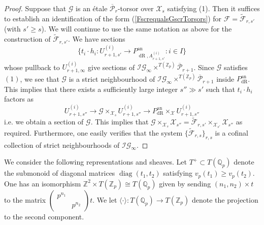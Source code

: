 \documentclass[10pt, oneside]{amsart}
\renewcommand{\tilde}{\widetilde}
\numberwithin{equation}{subsection}
\theoremstyle{definition}
\theoremstyle{remark}
\newcommand{\mbb}[1]{\mathbb{#1}}
\newcommand{\opn}[1]{\operatorname{#1}}
\begin{document}
\begin{proof}
    Suppose that $\mathscr{G}$ is an \'{e}tale $\overline{\mathcal{P}}_{r}$-torsor over $\mathcal{X}_s$ satisfying (1). Then it suffices to establish an identification of the form (\ref{FscrequalsGscrTorsors}) for $\mathscr{F} = \tilde{\mathcal{F}}_{r, s'}$ (with $s' \geq s$). We will continue to use the same notation as above for the construction of $\tilde{\mathcal{F}}_{r, s'}$. We have sections 
    \[
    \{ t_i \cdot h_i \colon U_{r+1, s'}^{(i)} \to P_{\opn{dR}, A_{r+1, s'}^{(i)}}^{\opn{an}} : i \in I \}
    \]
    whose pullback to $U_{r+1, \infty}^{(i)}$ give sections of $\mathcal{IG}_{\infty} \times^{T(\mbb{Z}_p)} \overline{\mathcal{P}}_{r+1}$. Since $\mathscr{G}$ satisfies $(1)$, we see that $\mathscr{G}$ is a strict neighbourhood of $\mathcal{IG}_{\infty} \times^{T(\mbb{Z}_p)} \overline{\mathcal{P}}_{r+1}$ inside $P_{\opn{dR}}^{\opn{an}}$. This implies that there exists a sufficiently large integer $s'' \gg s'$ such that $t_i \cdot h_i$ factors as
    \[
    U_{r+1, s''}^{(i)} \to \mathscr{G} \times_{\mathcal{X}_s} U_{r+1, s''}^{(i)} \to P_{\opn{dR}}^{\opn{an}} \times_{\mathcal{X}} U_{r+1, s''}^{(i)}
    \]
    i.e. we obtain a section of $\mathscr{G}$. This implies that $\mathscr{G} \times_{\mathcal{X}_s} \mathcal{X}_{s''} = \tilde{\mathcal{F}}_{r, s'} \times_{\mathcal{X}_{s'}} \mathcal{X}_{s''}$ as required. Furthermore, one easily verifies that the system $\{\tilde{\mathcal{F}}_{r, s} \}_{r, s}$ is a cofinal collection of strict neighbourhoods of $\mathcal{IG}_{\infty}$.
\end{proof}

We consider the following representations and sheaves. Let $T^+ \subset T(\mbb{Q}_p)$ denote the submonoid of diagonal matrices $\opn{diag}(t_1, t_2)$ satisfying $v_p(t_1) \geq v_p(t_2)$. One has an isomorphism $\mbb{Z}^2 \times T(\mbb{Z}_p) \cong T(\mbb{Q}_p)$ given by sending $(n_1, n_2) \times t$ to the matrix $\left( \begin{smallmatrix} p^{n_1} & \\ & p^{n_2} \end{smallmatrix}\right) t$. We let $\langle \cdot \rangle \colon T(\mbb{Q}_p) \to T(\mbb{Z}_p)$ denote the projection to the second component.
\end{document}
